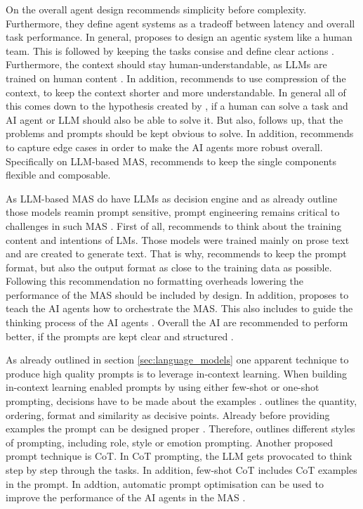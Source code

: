 \documentclass[a4paper,oneside,bibliography=totoc]{scrbook}
\begin{document}
On the overall agent design \citet{Anthropic2024} recommends simplicity before complexity. Furthermore, they define agent systems as a tradeoff between latency and overall task performance. In general, \citet{Hadfield2025} proposes to design an agentic system like a human team. This is followed by keeping the tasks consise and define clear actions \cite{OpenAI2025}. Furthermore, the context should stay human-understandable, as \acp{LLM} are trained on human content \cite{Anthropic2024}. In addition, \citet{Hadfield2025} recommends to use compression of the context, to keep the context shorter and more understandable. In general all of this comes down to the hypothesis created by \citet{Anthropic2024}, if a human can solve a task and \ac{AI} agent or \ac{LLM} should also be able to solve it. But also, \citet{Anthropic2024} follows up, that the problems and prompts should be kept obvious to solve. In addition, \citet{OpenAI2025} recommends to capture edge cases in order to make the \ac{AI} agents more robust overall. Specifically on \ac{LLM}-based \ac{MAS}, \citet{OpenAI2025} recommends to keep the single components flexible and composable.

As \ac{LLM}-based \ac{MAS} do have \acp{LLM} as decision engine and as already outline those models reamin prompt sensitive, prompt engineering remains critical to challenges in such \ac{MAS} \cite{OpenAI2025}. First of all, \citet{Anthropic2024} recommends to think about the training content and intentions of \acp{LM}. Those models were trained mainly on prose text and are created to generate text. That is why, \citet{Anthropic2024} recommends to keep the prompt format, but also the output format as close to the training data as possible. Following this recommendation no formatting overheads lowering the performance of the \ac{MAS} should be included by design. In addition, \citet{Hadfield2025} proposes to teach the \ac{AI} agents how to orchestrate the \ac{MAS}. This also includes to guide the thinking process of the \ac{AI} agents \cite{Anthropic2024}. Overall the \ac{AI} are recommended to perform better, if the prompts are kept clear and structured \cite{OpenAI2025}.

As already outlined in section \ref{sec:language_models} one apparent technique to produce high quality prompts is to leverage in-context learning. When building in-context learning enabled prompts by using either few-shot or one-shot prompting, decisions have to be made about the examples \cite{Schulhoff2025}. \citet{Schulhoff2025} outlines the quantity, ordering, format and similarity as decisive points. Already before providing examples the prompt can be designed proper \cite{Schulhoff2025}. Therefore, \citet{Schulhoff2025} outlines different styles of prompting, including role, style or emotion prompting. Another proposed prompt technique is \ac{CoT}. In \ac{CoT} prompting, the \ac{LLM} gets provocated to think step by step through the tasks. In addition, few-shot \ac{CoT} includes \ac{CoT} examples in the prompt. In addtion, automatic prompt optimisation can be used to improve the performance of the \ac{AI} agents in the \ac{MAS} \cite{Schulhoff2025}.
\end{document}
